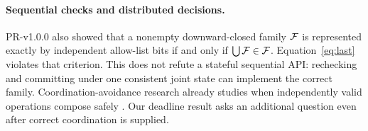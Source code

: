 \documentclass[11pt,a4paper]{article}
\theoremstyle{definition}\newtheorem{definition}{Definition}
\begin{document}
\paragraph{Sequential checks and distributed decisions.}
PR-v1.0.0 also showed that a nonempty downward-closed family $\mathcal F$ is represented exactly by independent allow-list bits if and only if $\bigcup\mathcal F\in\mathcal F$. Equation~\eqref{eq:last} violates that criterion. This does not refute a stateful sequential API: rechecking and committing under one consistent joint state can implement the correct family. Coordination-avoidance research already studies when independently valid operations compose safely \cite{bailis}. Our deadline result asks an additional question even after correct coordination is supplied.
\end{document}
